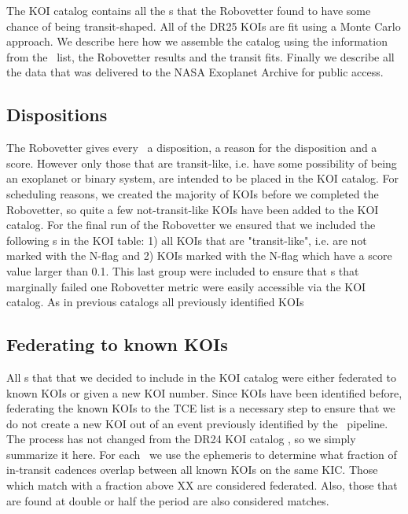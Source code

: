 The KOI catalog contains all the \opstce s that the Robovetter found to have some chance of being transit-shaped. All of the DR25 KOIs are fit using a Monte Carlo approach. We describe here how we assemble the catalog using the information from the \opstce\ list, the Robovetter results and the transit fits. Finally we describe all the data that was delivered to the NASA Exoplanet Archive for public access.
\label{koisec}

\subsection{Dispositions}
The Robovetter gives every \opstce\ a disposition, a reason for the disposition and a score.  However only those that are transit-like, i.e. have some possibility of being an exoplanet or binary system, are intended to be placed in the KOI catalog. For scheduling reasons, we created the majority of KOIs before we completed the Robovetter, so quite a few not-transit-like KOIs have been added to the KOI catalog. For the final run of the Robovetter we ensured that we included the following \opstce s in the KOI table: 1) all KOIs that are "transit-like", i.e. are not marked with the N-flag and 2) KOIs marked with the N-flag which have a score value larger than 0.1.  This last group were included to ensure that \opstce s that marginally failed one Robovetter metric were easily accessible via the KOI catalog. As in previous catalogs all previously identified KOIs


\subsection{Federating to known KOIs}
All \opstce s that that we decided to include in the KOI catalog were either federated to known KOIs or given a new KOI number. Since KOIs have been identified before, federating the known KOIs to the TCE list is a necessary step to ensure that we do not create a new KOI out of an event previously identified by the \Kepler\ pipeline.  The process has not changed from the  DR24 KOI catalog \citep{Coughlin2016}, so we simply summarize it here.  For each \opstce\ we use the ephemeris to determine what fraction of in-transit cadences overlap between all known KOIs on the same KIC.  Those which match with a fraction above XX are considered federated.  Also, those that are found at double or half the period are also considered matches.  


